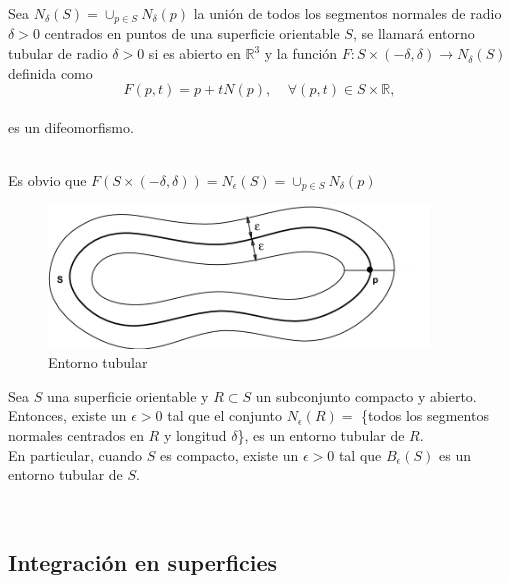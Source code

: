 \begin{definicion}
	Sea $N_{\delta}(S) = \cup_{p \in S} N_{\delta}(p)$ la unión de todos los segmentos normales de radio $\delta > 0$ centrados en puntos de una superficie orientable $S$, se llamará entorno tubular de radio $\delta > 0$ si es abierto en $\mathbb{R}^3$ y la función $F : S \times (-\delta, \delta) \to N_{\delta}(S)$ definida como
	${ }$\\
	$$ F(p,t) = p +tN(p), \;\;\;\; \forall (p,t) \in S \times \mathbb{R}, $$
	${ }$\\
	es un difeomorfismo.
\end{definicion}
${ }$\\

Es obvio que $F(S \times (-\delta, \delta)) = N_{\epsilon}(S) = \cup_{p \in S} N_{\delta}(p)$
${ }$\\

\begin{figure}[h]
	\begin{center}
		\includegraphics[width=0.9\textwidth]{imagenes/tubular.png}
	\end{center}
	\caption{Entorno tubular}
	\label{fig:etiq_13}
\end{figure}

\begin{teorema}
	Sea $S$ una superficie orientable y $R \subset S$ un subconjunto compacto y abierto. Entonces, existe un $\epsilon > 0$ tal que el conjunto $N_{\epsilon}(R) =$ \{todos los segmentos normales centrados en $R$ y longitud $\delta$\}, es un entorno tubular de $R$.
	${ }$\\
	
	En particular, cuando $S$ es compacto, existe un $\epsilon > 0$ tal que $B_{\epsilon}(S)$ es un entorno tubular de $S$.
\end{teorema}




${ }$\\
\subsection{Integración en superficies}
${ }$\\


